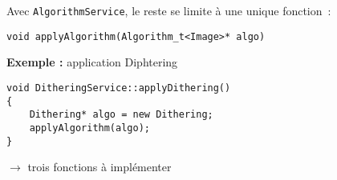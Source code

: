 \begin{frame}[containsverbatim]
Avec \texttt{AlgorithmService}, le reste se limite à une unique fonction~:

\begin{verbatim}
void applyAlgorithm(Algorithm_t<Image>* algo)
\end{verbatim}

\vspace{1cm}

\textbf{Exemple :} application Diphtering

\begin{verbatim}
void DitheringService::applyDithering()
{ 
    Dithering* algo = new Dithering;
    applyAlgorithm(algo);
}
\end{verbatim}

$\longrightarrow$ trois fonctions à implémenter
\end{frame}

